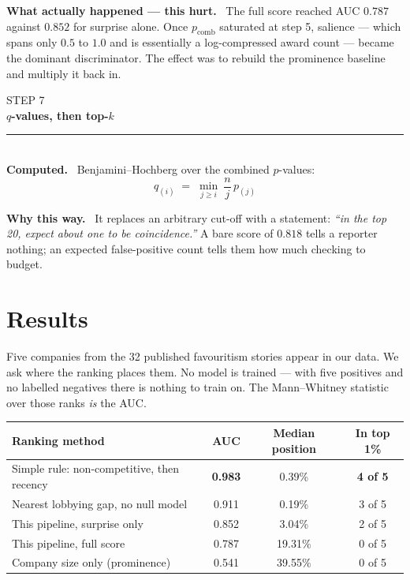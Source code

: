\documentclass[11pt,a4paper]{article}
\newcommand{\stephead}[2]{%
  \vspace{1.1em}\noindent
  {\color{slate}\ttfamily\footnotesize STEP #1}\\[-0.15em]
  {\large\bfseries\color{pine} #2}\\[0.25em]
  {\color{rulec}\rule{\linewidth}{0.6pt}}\\[0.3em]}
\newcommand{\field}[1]{\smallskip\noindent\textbf{#1}\ }
\begin{document}
\field{\textcolor{mulberry}{What actually happened --- this hurt.}}
The full score reached AUC $0.787$ against $0.852$ for surprise alone. Once
$p_{\mathrm{comb}}$ saturated at step 5, salience --- which spans only $0.5$ to $1.0$ and
is essentially a log-compressed award count --- became the dominant discriminator. The
effect was to rebuild the prominence baseline and multiply it back in.

\stephead{7}{$q$-values, then top-$k$}

\field{Computed.} Benjamini--Hochberg over the combined $p$-values:
\[
q_{(i)} \;=\; \min_{j \ge i}\ \frac{n}{j}\, p_{(j)}
\]

\field{Why this way.}
It replaces an arbitrary cut-off with a statement: \emph{``in the top 20, expect about one
to be coincidence.''} A bare score of $0.818$ tells a reporter nothing; an expected
false-positive count tells them how much checking to budget.

\section*{Results}

Five companies from the 32 published favouritism stories appear in our data. We ask where
the ranking places them. No model is trained --- with five positives and no labelled
negatives there is nothing to train on. The Mann--Whitney statistic over those ranks
\emph{is} the AUC.

\begin{center}\small
\begin{tabular}{@{}lccc@{}}
\toprule
\textbf{Ranking method} & \textbf{AUC} & \textbf{Median position} & \textbf{In top 1\%} \\
\midrule
Simple rule: non-competitive, then recency & \textbf{0.983} & 0.39\% & \textbf{4 of 5} \\
Nearest lobbying gap, no null model        & 0.911 & 0.19\% & 3 of 5 \\
This pipeline, surprise only               & 0.852 & 3.04\% & 2 of 5 \\
\textcolor{mulberry}{This pipeline, full score} & \textcolor{mulberry}{0.787} & \textcolor{mulberry}{19.31\%} & \textcolor{mulberry}{0 of 5} \\
Company size only (prominence)             & 0.541 & 39.55\% & 0 of 5 \\
\bottomrule
\end{tabular}
\end{center}
\end{document}
